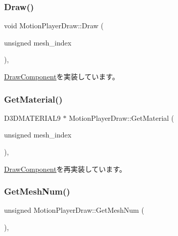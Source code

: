 \subsubsection{\texorpdfstring{Draw()}{Draw()}}
{\footnotesize\ttfamily void Motion\+Player\+Draw\+::\+Draw (\begin{DoxyParamCaption}\item[{unsigned}]{mesh\+\_\+index }\end{DoxyParamCaption})\hspace{0.3cm}{\ttfamily [override]}, {\ttfamily [virtual]}}



\mbox{\hyperlink{class_draw_component_ae84bfb6ccc2fda9e54cdff45057ea2c3}{Draw\+Component}}を実装しています。

\mbox{\label{class_motion_player_draw_a5881c5114b069f5e8ceb91a5cb388205}} 
\subsubsection{\texorpdfstring{Get\+Material()}{GetMaterial()}}
{\footnotesize\ttfamily D3\+D\+M\+A\+T\+E\+R\+I\+A\+L9 $\ast$ Motion\+Player\+Draw\+::\+Get\+Material (\begin{DoxyParamCaption}\item[{unsigned}]{mesh\+\_\+index }\end{DoxyParamCaption})\hspace{0.3cm}{\ttfamily [override]}, {\ttfamily [virtual]}}



\mbox{\hyperlink{class_draw_component_adae078d5139f691997763bf6cac9e25a}{Draw\+Component}}を再実装しています。

\mbox{\label{class_motion_player_draw_ae671eb029c18c7927fa6671b6a8fb637}} 
\subsubsection{\texorpdfstring{Get\+Mesh\+Num()}{GetMeshNum()}}
{\footnotesize\ttfamily unsigned Motion\+Player\+Draw\+::\+Get\+Mesh\+Num (\begin{DoxyParamCaption}{ }\end{DoxyParamCaption})\hspace{0.3cm}{\ttfamily [override]}, {\ttfamily [virtual]}}




